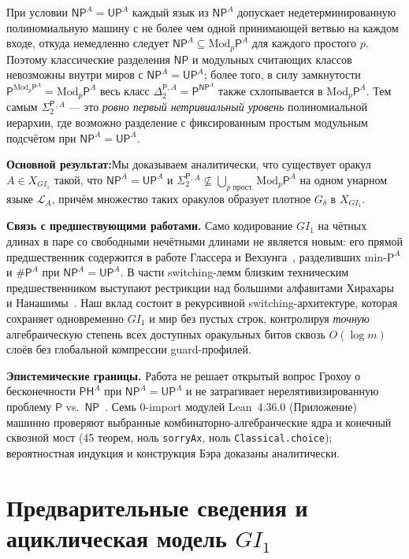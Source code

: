 \documentclass[11pt,a4paper]{article}
\theoremstyle{definition}
\theoremstyle{remark}
\newcommand{\Pcl}{\mathsf{P}}
\newcommand{\NP}{\mathsf{NP}}
\newcommand{\UP}{\mathsf{UP}}
\newcommand{\PH}{\mathsf{PH}}
\newcommand{\Modp}{\mathrm{Mod}_p\mathsf{P}}
\newcommand{\SharpP}{\#\mathsf{P}}
\newcommand{\SigTwo}{\Sigma_2^{\mathsf{P}}}
\newcommand{\GI}{GI_1}
\newcommand{\takeaway}[2]{%
  \vspace{4pt}\noindent\colorbox{primary!7}{%
    \parbox{\dimexpr\linewidth-2\fboxsep\relax}{%
      \vspace{3pt}\textbf{\color{primary}#1:}\hspace{0.4em}#2\vspace{3pt}%
    }%
  }\vspace{4pt}%
}
\begin{document}
При условии $\NP^A = \UP^A$ каждый язык из $\NP^A$ допускает недетерминированную полиномиальную машину с не более чем одной принимающей ветвью на каждом входе, откуда немедленно следует $\NP^A \subseteq \Modp^A$ для каждого простого $p$. Поэтому классические разделения $\NP$ и модульных считающих классов невозможны внутри миров с $\NP^A = \UP^A$; более того, в силу замкнутости $\Pcl^{\Modp^A} = \Modp^A$ весь класс $\Delta_2^{\Pcl,A} = \Pcl^{\NP^A}$ также схлопывается в $\Modp^A$. Тем самым $\SigTwo{}^{,A}$ — это \emph{ровно первый нетривиальный уровень} полиномиальной иерархии, где возможно разделение с фиксированным простым модульным подсчётом при $\NP^A = \UP^A$.

\takeaway{Основной результат}{Мы доказываем аналитически, что существует оракул $A \in X_{\GI}$ такой, что $\NP^A = \UP^A$ и $\SigTwo{}^{,A} \not\subseteq \bigcup_{p\text{ прост.}} \Modp^A$ на одном унарном языке $\mathcal{L}_A$, причём множество таких оракулов образует плотное $G_\delta$ в $X_{\GI}$.}

\textbf{Связь с предшествующими работами.} Само кодирование $\GI$ на чётных длинах в паре со свободными нечётными длинами не является новым: его прямой предшественник содержится в работе Глассера и Вехзунга~\cite{GlasserWechsung2003}, разделивших $\mathrm{min\text{-}P}^A$ и $\SharpP^A$ при $\NP^A = \UP^A$. В части switching-лемм близким техническим предшественником выступают рестрикции над большими алфавитами Хирахары и Нанашимы~\cite{HiraharaNanashima2021}. Наш вклад состоит в рекурсивной switching-архитектуре, которая сохраняет одновременно $\GI$ и мир без пустых строк, контролируя \emph{точную} алгебраическую степень всех доступных оракульных битов сквозь $O(\log m)$ слоёв без глобальной компрессии guard-профилей.

\textbf{Эпистемические границы.} Работа не решает открытый вопрос Грохоу о бесконечности $\PH^A$ при $\NP^A = \UP^A$ и не затрагивает нерелятивизированную проблему $\Pcl$ vs.\ $\NP$~\cite{Cook2000,RazborovRudich1997}. Семь 0-import модулей Lean~4.36.0 (Приложение) машинно проверяют выбранные комбинаторно-алгебраические ядра и конечный сквозной мост (45 теорем, ноль \texttt{sorryAx}, ноль \texttt{Classical.choice}); вероятностная индукция и конструкция Бэра доказаны аналитически.

\section{Предварительные сведения и ациклическая модель $\GI$}
\end{document}

